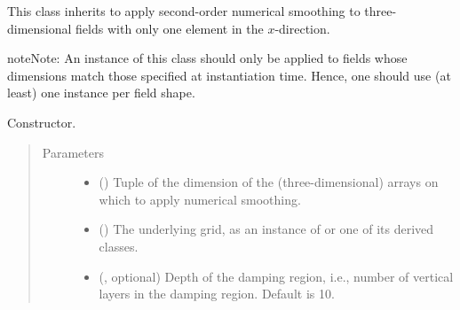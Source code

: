 \documentclass[letterpaper,10pt,english]{sphinxmanual}
\begin{document}
\begin{fulllineitems}
\label{\detokenize{api:tasmania.dycore.horizontal_smoothing.HorizontalSmoothingSecondOrderYZ}}
This class inherits {\hyperref[\detokenize{api:tasmania.dycore.horizontal_smoothing.HorizontalSmoothing}]{}} to apply second-order
numerical smoothing to three-dimensional fields with only one element in the \(x\)-direction.

\begin{sphinxadmonition}{note}{Note:}
An instance of this class should only be applied to fields whose dimensions match those specified at instantiation time.
Hence, one should use (at least) one instance per field shape.
\end{sphinxadmonition}

\begin{fulllineitems}
\label{\detokenize{api:tasmania.dycore.horizontal_smoothing.HorizontalSmoothingSecondOrderYZ.__init__}}
Constructor.
\begin{quote}\begin{description}
\item[{Parameters}] \leavevmode\begin{itemize}
\item {} 
 () \textendash{} Tuple of the dimension of the (three-dimensional) arrays on which to apply numerical smoothing.

\item {} 
 () \textendash{} The underlying grid, as an instance of {\hyperref[\detokenize{api:tasmania.grids.grid_xyz.GridXYZ}]{}} or one of its derived classes.

\item {} 
 (, optional) \textendash{} Depth of the damping region, i.e., number of vertical layers in the damping region. Default is 10.


\end{itemize}
\end{description}
\end{quote}
\end{fulllineitems}
\end{fulllineitems}
\end{document}
